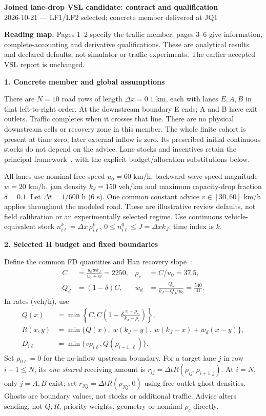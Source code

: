 \documentclass[10pt,a4paper]{article}
\newcommand{\head}[1]{\par\medskip\textbf{#1}\par}
\begin{document}
\begin{center}
{\large\bfseries Joined lane-drop VSL candidate: contract and qualification}\\[3pt]
2026-10-21 --- LF1/LF2 selected; concrete member delivered at JQ1
\end{center}
\textbf{Reading map.} Pages 1--2 specify the traffic member; pages 3--6 give
information, complete-accounting and derivative qualifications. These are
analytical results and declared defaults, not simulator or traffic experiments.
The earlier accepted VSL report is unchanged.

\head{1. Concrete member and global assumptions}
There are $N=10$ road rows of length $\Delta x=0.1$ km, each with lanes
$E,A,B$ in that left-to-right order. At the downstream boundary E ends;
A and B have exit outlets. Traffic completes when it crosses that line.
There are no physical downstream cells or recovery zone in this member.
The whole finite cohort is present at time zero; later external inflow is
zero. Its prescribed initial continuous stocks do not depend on the advice.
Lane stocks and incentives retain the principal framework~\cite{ns}, with
the explicit budget/allocation substitutions below.

All lanes use nominal free speed $u_0=60$ km/h, backward wave-speed magnitude
$w=20$ km/h, jam density $k_J=150$ veh/km and maximum capacity-drop fraction
$\delta=0.1$. Let $\Delta t=1/600$ h (6 s). One common constant advice
$v\in[30,60]$ km/h applies throughout the modeled road. These are illustrative
review defaults, not field calibration or an experimentally selected regime.
Use continuous vehicle-equivalent stock $n^k_{i\ell}=\Delta x\,\rho^k_{i\ell}$,
$0\leq n^0_{i\ell}\leq J=\Delta x k_J$; time index is $k$.

\head{2. Selected H budget and fixed boundaries}
Define the common FD quantities and Han recovery slope~\cite{han16,han17}:
\begin{align}
 C&=\frac{u_0wk_J}{u_0+w}=2250, & \rho_c&=C/u_0=37.5,\nonumber\\
 Q_J&=(1-\delta)C, & w_d&=\frac{Q_J}{k_J-Q_J/u_0}=\frac{540}{31}.
 \label{eq:fd}
\end{align}
In rates (veh/h), use
\begin{align}
 Q(x)&=\min\left\{C,C\left(1-\delta\frac{x-\rho_c}{k_J-\rho_c}\right)\right\},\nonumber\\
 R(x,y)&=\min\{Q(x),\ w(k_J-y),\ w(k_J-x)+w_d(x-y)\},\nonumber\\
 D_{i\ell}&=\min\{v\rho_{i\ell},Q(\rho_{i-1,\ell})\}. \label{eq:H}
\end{align}
Set $\rho_{0\ell}=0$ for the no-inflow upstream boundary. For a target lane
$j$ in row $i+1\leq N$, its \emph{one shared} receiving amount is
$r_{ij}=\Delta t R(\rho_{ij},\rho_{i+1,j})$. At $i=N$, only $j=A,B$ exist;
set $r_{Nj}=\Delta t R(\rho_{Nj},0)$ using free outlet ghost densities.
Ghosts are boundary values, not stocks or additional traffic. Advice alters
sending, not $Q,R$, priority weights, geometry or nominal $\rho_c$ directly.
\end{document}
